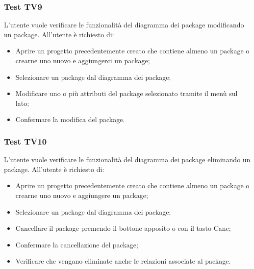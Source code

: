\documentclass[../PianoDiQualifica.tex]{subfiles}
\begin{document}
	\subsubsection{Test TV9} 
	L'utente vuole verificare le funzionalità del diagramma dei package modificando un package. 
	All'utente è richiesto di: 
	\begin{itemize} 
		\item Aprire un progetto precedentemente creato che contiene almeno un package o crearne uno nuovo e aggiungerci un package; 
		\item Selezionare un package dal diagramma dei package; 
		\item Modificare uno o più attributi del package selezionato tramite il menù sul lato; %
		\item Confermare la modifica del package. 
	\end{itemize} 
	
	\subsubsection{Test TV10} 
	L'utente vuole verificare le funzionalità del diagramma dei package eliminando un package. 
	All'utente è richiesto di: 
	\begin{itemize} 
		\item Aprire un progetto precedentemente creato che contiene almeno un package  o crearne uno nuovo e aggiungere un package; 
		\item Selezionare un package dal diagramma dei package; 
		\item Cancellare il package premendo il bottone apposito o con il tasto Canc; 
		\item Confermare la cancellazione del package; 
		\item Verificare che vengano eliminate anche le relazioni associate al package. 
	\end{itemize}  %
	
	
\end{document}
